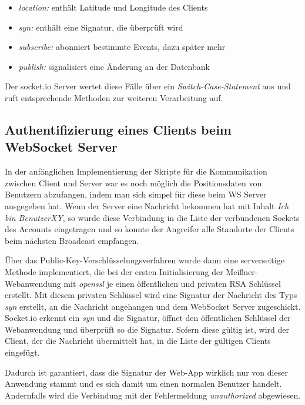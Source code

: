 \begin{itemize}
	\item[] \emph{location:} enthält Latitude und Longitude des Clients
	\item[] \emph{syn:} enthält eine Signatur, die überprüft wird
	\item[] \emph{subscribe:} abonniert bestimmte Events, dazu später mehr
	\item[] \emph{publish:} signalisiert eine Änderung an der Datenbank
\end{itemize}

Der socket.io Server wertet diese Fälle über ein \emph{Switch-Case-Statement} aus und ruft entsprechende Methoden zur weiteren Verarbeitung auf.

\subsection{Authentifizierung eines Clients beim WebSocket Server}
In der anfänglichen Implementierung der Skripte für die Kommunikation zwischen Client und Server war es noch möglich die Positionsdaten von Benutzern abzufangen, indem man sich simpel für diese beim WS Server ausgegeben hat. Wenn der Server eine Nachricht bekommen hat mit Inhalt \emph{Ich bin \glqq BenutzerXY\grqq{}}, so wurde diese Verbindung in die Liste der verbundenen Sockets des Accounts eingetragen und so konnte der \glqq Angreifer\grqq{} alle Standorte der Clients beim nächsten Broadcast empfangen.\par

Über das Public-Key-Verschlüsselungsverfahren wurde dann eine serverseitige Methode implementiert, die bei der ersten Initialisierung der Meißner-Webanwendung mit \emph{openssl} je einen öffentlichen und privaten RSA Schlüssel erstellt. Mit diesem privaten Schlüssel wird eine Signatur der Nachricht des Typs \emph{syn} erstellt, an die Nachricht angehangen und dem WebSocket Server zugeschickt.\\
Socket.io erkennt ein \emph{syn} und die Signatur, öffnet den öffentlichen Schlüssel der Webanwendung und überprüft so die Signatur. Sofern diese gültig ist, wird der Client, der die Nachricht übermittelt hat, in die Liste der gültigen Clients eingefügt.\par

Dadurch ist garantiert, dass die Signatur der Web-App wirklich nur von dieser Anwendung stammt und es sich damit um einen normalen Benutzer handelt. Andernfalls wird die Verbindung mit der Fehlermeldung \emph{unauthorized} abgewiesen.\par

